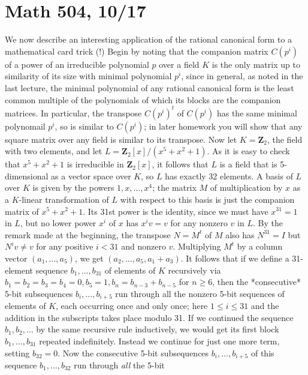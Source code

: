 \documentclass[10pt]{article}
\begin{document}
\section*{Math 504, 10/17}

We now describe an interesting application of the rational canonical
form to a mathematical card trick (!) Begin by noting that the companion
matrix $C(p^i)$ of a power of an irreducible polynomial $p$ over a field
$K$ is the only matrix up to similarity of its size with minimal
polynomial $p^i$, since in general, as noted in the last lecture, the
minimal polynomial of any rational canonical form is the least common
multiple of the polynomials of which its blocks are the companion
matrices. In particular, the transpose $C(p^i)^t$ of $C(p^i)$ has the
same minimal polynomail $p^i$, so is similar to $C(p^i)$; in later
homework you will show that any square matrix over any field is similar
to its transpose. Now let $K=\mathbf{Z}_2$, the field with two elements,
and let $L=\mathbf{Z}_2[x]/(x^5 + x^2 + 1)$. As it is easy to check that
$x^5 + x^2 + 1$ is irreducible in $\mathbf{Z}_2[x]$, it follows that $L$
is a field that is 5-dimensional as a vector space over $K$, so $L$ has
exactly 32 elements. A basis of $L$ over $K$ is given by the powers
$1,x,\ldots,x^4$; the matrix $M$ of multiplication by $x$ as a
$K$-linear transformation of $L$ with respect to this basis is just the
companion matrix of $x^5 + x^2 + 1$. Its 31st power is the identity,
since we must have $x^31 = 1$ in $L$, but no lower power $x^i$ of $x$
has $x^i v = v$ for any nonzero $v$ in $L$. By the remark made at the
beginning, the transpose $N=M^t$ of $M$ also has $N^{31} = I$ but $N^i
v\ne v$ for any positive $i<31$ and nonzero $v$. Multiplying $M^t$ by a
column vector $(a_1,\ldots,a_5)$, we get $(a_2,\ldots,a_5,a_1 + a_3)$.
It follows that if we define a 31-element sequence $b_1,\ldots,b_{31}$
of elements of $K$ recursively via $b_1=b_2=b_3=b_4=0, b_5=1, b_n =
b_{n-3}+b_{n-5}$ for $n\ge6$, then the *consecutive* 5-bit subsequences
$b_i,\ldots,b_{i+5}$ run through all the nonzero 5-bit sequences of
elements of $K$, each occurring once and only once; here $1\le i\le 31$
and the addition in the subscripts takes place modulo 31. If we
continued the sequence $b_1,b_2,\ldots$ by the same recursive rule
inductively, we would get its first block $b_1,\ldots,b_{31}$ repeated
indefinitely. Instead we continue for just one more term, setting
$b_{32}= 0$. Now the consecutive 5-bit subsequences $b_i,\ldots,b_{i+5}$
of this sequence $b_1,\ldots,b_{32}$ run through \emph{all} the 5-bit
\end{document}
